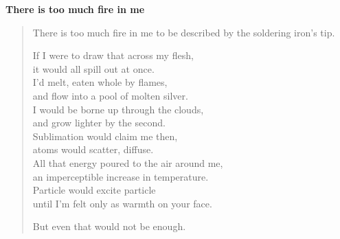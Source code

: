 {\large \textbf{There is too much fire in me}}
\begin{verse}
  There is too much fire in me to be described by the soldering iron's tip.

  If I were to draw that across my flesh,\\
  \vin it would all spill out at once.\\
  I'd melt, eaten whole by flames,\\
  \vin and flow into a pool of molten silver.\\
  I would be borne up through the clouds,\\
  \vin and grow lighter by the second.\\
  Sublimation would claim me then,\\
  \vin atoms would scatter, diffuse.\\
  All that energy poured to the air around me,\\
  \vin an imperceptible increase in temperature.\\
  Particle would excite particle\\
  \vin until I'm felt only as warmth on your face.

  But even that would not be enough.
\end{verse}
